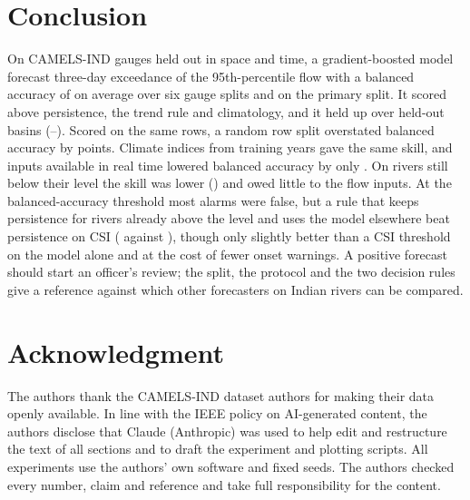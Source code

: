 \documentclass[conference]{IEEEtran}
\begin{document}
\section{Conclusion}
On CAMELS-IND gauges held out in space and time, a gradient-boosted model forecast three-day exceedance of the 95th-percentile flow with a balanced accuracy of \SplitBAMean{} on average over six gauge splits and \XgbBA{} on the primary split. It scored above persistence, the trend rule and climatology, and it held up over held-out basins (\BasinBAMin--\BasinBAMax). Scored on the same rows, a random row split overstated balanced accuracy by \SrGapBA{} points. Climate indices from training years gave the same skill, and inputs available in real time lowered balanced accuracy by only \RtDiff. On rivers still below their level the skill was lower (\OnXgbBA) and owed little to the flow inputs. At the balanced-accuracy threshold most alarms were false, but a rule that keeps persistence for rivers already above the level and uses the model elsewhere beat persistence on CSI (\HyCSI{} against \PeCSI), though only slightly better than a CSI threshold on the model alone and at the cost of fewer onset warnings. A positive forecast should start an officer's review; the split, the protocol and the two decision rules give a reference against which other forecasters on Indian rivers can be compared.

\section*{Acknowledgment}
The authors thank the CAMELS-IND dataset authors for making their data openly available.
In line with the IEEE policy on AI-generated content, the authors disclose that Claude (Anthropic) was used to help edit and restructure the text of all sections and to draft the experiment and plotting scripts. All experiments use the authors' own software and fixed seeds. The authors checked every number, claim and reference and take full responsibility for the content.
\end{document}

